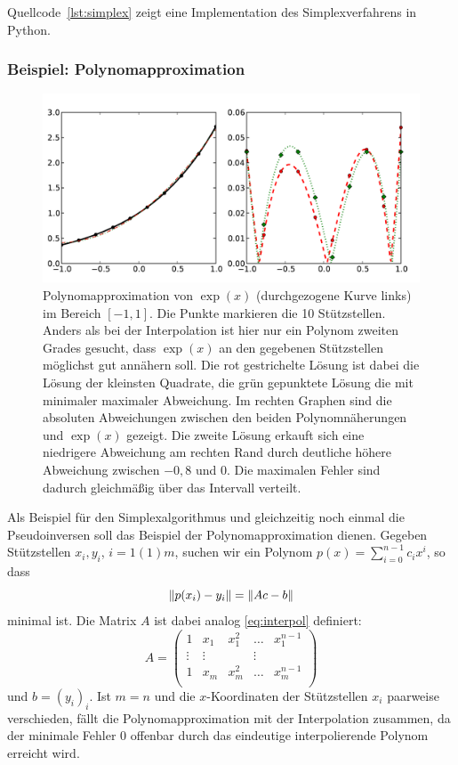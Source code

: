 Quellcode~\ref{lst:simplex} zeigt eine Implementation des
Simplexverfahrens in Python.

\subsubsection{Beispiel: Polynomapproximation}

\begin{figure}[t]
  \centering
  \includegraphics[width=\textwidth]{plots/qr_simplex_example}
  \caption{Polynomapproximation von $\exp(x)$ (durchgezogene Kurve
    links) im Bereich $[-1,1]$. Die Punkte markieren die 10
    Stützstellen. Anders als bei der Interpolation ist hier nur ein
    Polynom zweiten Grades gesucht, dass $\exp(x)$ an den gegebenen
    Stützstellen möglichst gut annähern soll. Die rot gestrichelte
    Lösung ist dabei die Lösung der kleinsten Quadrate, die grün
    gepunktete Lösung die mit minimaler maximaler Abweichung. Im
    rechten Graphen sind die absoluten Abweichungen zwischen den
    beiden Polynomnäherungen und $\exp(x)$ gezeigt. Die zweite Lösung
    erkauft sich eine niedrigere Abweichung am rechten Rand durch
    deutliche höhere Abweichung zwischen $-0,8$ und $0$. Die maximalen
    Fehler sind dadurch gleichmäßig über das Intervall verteilt.}
  \label{fig:polyapprox}
\end{figure}

Als Beispiel für den Simplexalgorithmus und gleichzeitig noch einmal
die Pseudoinversen soll das Beispiel der Polynomapproximation
dienen. Gegeben Stützstellen $x_i, y_i$, $i=1(1)m$, suchen wir ein
Polynom $p(x)=\sum_{i=0}^{n-1} c_ix^i$, so dass
\begin{equation}
  \left\lVert{p(x_i) - y_i}\right\rVert = \left\lVert{A c - b}\right\rVert
\end{equation}
minimal ist. Die Matrix $A$ ist dabei analog \eqref{eq:interpol} definiert:
\begin{equation}
  A=
  \begin{pmatrix}
    1 & x_1 & x_1^2 & \ldots & x_1^{n-1}\\
    \vdots & \vdots & & \vdots \\
    1 & x_m & x_m^2 & \ldots & x_m^{n-1}\\
  \end{pmatrix}
\end{equation}
und $b=(y_i)_i$. Ist $m=n$ und die $x$-Koordinaten der Stützstellen
$x_i$ paarweise verschieden, fällt die Polynomapproximation mit der
Interpolation zusammen, da der minimale Fehler $0$ offenbar durch das
eindeutige interpolierende Polynom erreicht wird.


